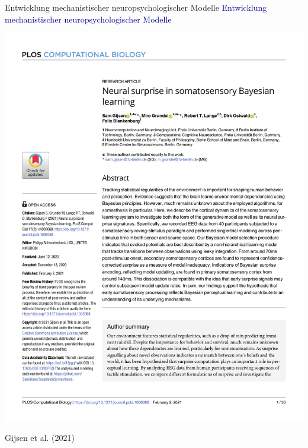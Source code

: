 \documentclass[
  8pt,
  ignorenonframetext,
]{beamer}
\begin{document}
\begin{frame}{Entwicklung mechanistischer neuropsychologischer Modelle}
\protect\hypertarget{entwicklung-mechanistischer-neuropsychologischer-modelle}{}
\textcolor{darkblue}{Entwicklung mechanistischer neuropsychologischer Modelle}
\vspace{2mm}

\begin{center}\includegraphics[width=0.6\linewidth]{2_Abbildungen/pfm_2_gijsen_abstract} \end{center}
\flushright
\footnotesize

Gijsen et al. (2021)
\end{frame}
\end{document}
